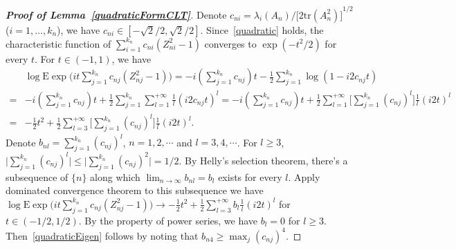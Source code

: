 \documentclass[review]{elsarticle}
\theoremstyle{plain}
\theoremstyle{definition}
\theoremstyle{remark}
\begin{document}
\begin{proof}[\textbf{Proof of Lemma~\ref{quadraticFormCLT}}]
    Denote $c_{ni}=\lambda_i(A_n)/{\big[2\mathrm{tr}(A_n^2)\big]}^{1/2}$ ($i=1,\ldots,k_n$), we have $c_{ni}\in[-\sqrt{2}/2,\sqrt{2}/2]$.
    Since~\ref{quadratic} holds, the characteristic function of
        $
        \sum_{i=1}^{k_n}c_{ni}(Z_{ni}^2-1)
    $
    converges to $\exp(-t^2/2)$ for every $t$. For $t\in (-1,1)$, we have
    \begin{equation*}
        \begin{aligned}
            &\log \mathrm{E}\exp{\big(it \sum_{j=1}^{k_n}c_{nj}(Z_{nj}^2-1)\big)}
            =
            -i(\sum_{j=1}^{k_n}c_{nj})t-
            \frac{1}{2}\sum_{j=1}^{k_n}\log(1-i2c_{nj}t)\\
            =&
            -i(\sum_{j=1}^{k_n}c_{nj})t+
            \frac{1}{2}\sum_{j=1}^{k_n}\sum_{l=1}^{+\infty}\frac{1}{l}{(i2c_{nj}t)}^l
            =
            -i(\sum_{j=1}^{k_n}c_{nj})t+
            \frac{1}{2}\sum_{l=1}^{+\infty}\Big[\sum_{j=1}^{k_n}{(c_{nj})}^l\Big]\frac{1}{l}{(i2t)}^l\\
            =&-\frac{1}{2}t^2+
            \frac{1}{2}\sum_{l=3}^{+\infty}\Big[\sum_{j=1}^{k_n}{(c_{nj})}^l\Big]\frac{1}{l}{(i2t)}^l.
        \end{aligned}
    \end{equation*}
    Denote $b_{nl}=\sum_{j=1}^{k_n}{(c_{nj})}^l$, $n=1,2,\cdots$ and $l=3,4,\cdots$. For $l\geq 3$, $\big|\sum_{j=1}^{k_n}{(c_{nj})}^l\big|\leq \big|\sum_{j=1}^{k_n}{(c_{nj})}^2\big|=1/2$.
    By Helly's selection theorem, there's a subsequence of $\{n\}$ along which $\lim_{n\to \infty}b_{nl}=b_l$ exists for every $l$.
    Apply dominated convergence theorem to this subsequence we have
            $\log \mathrm{E}\exp{\big(it \sum_{j=1}^{k_n}c_{nj}(Z_{nj}^2-1)\big)}\to
            -\frac{1}{2}t^2+
            \frac{1}{2}\sum_{l=3}^{+\infty}b_l\frac{1}{l}{(i2t)}^l$ for $t\in(-1/2,1/2)$.
            By the property of power series, we have $b_l=0$ for $l\geq 3$. Then~\ref{quadraticEigen} follows by noting that $b_{n4}\geq \max_j{(c_{nj})}^4$.
\end{proof}
\end{document}

